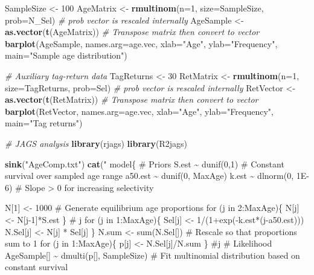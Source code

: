 \documentclass[
]{krantz}
\makeatletter
\newenvironment{Shaded}{\begin{snugshade}}{\end{snugshade}}
\newcommand{\AttributeTok}[1]{\textcolor[rgb]{0.27,0.27,0.27}{#1}}
\newcommand{\CommentTok}[1]{\textcolor[rgb]{0.37,0.37,0.37}{\textit{#1}}}
\newcommand{\DecValTok}[1]{\textcolor[rgb]{0.06,0.06,0.06}{#1}}
\newcommand{\FunctionTok}[1]{\textcolor[rgb]{0.27,0.27,0.27}{\textbf{#1}}}
\newcommand{\NormalTok}[1]{#1}
\newcommand{\OtherTok}[1]{\textcolor[rgb]{0.37,0.37,0.37}{#1}}
\newcommand{\StringTok}[1]{\textcolor[rgb]{0.5,0.5,0.5}{#1}}
\newenvironment{kframe}{%
\medskip{}
\setlength{\fboxsep}{.8em}
 \def\at@end@of@kframe{}%
 \ifinner\ifhmode%
  \def\at@end@of@kframe{\end{minipage}}%
  \begin{minipage}{\columnwidth}%
 \fi\fi%
 \def\FrameCommand##1{\hskip\@totalleftmargin \hskip-\fboxsep
 \colorbox{shadecolor}{##1}\hskip-\fboxsep
     \hskip-\linewidth \hskip-\@totalleftmargin \hskip\columnwidth}%
 \MakeFramed {\advance\hsize-\width
   \@totalleftmargin\z@ \linewidth\hsize
   \@setminipage}}%
 {\par\unskip\endMakeFramed%
 \at@end@of@kframe}
\renewenvironment{Shaded}{\begin{kframe}}{\end{kframe}}
\makeatother
\begin{document}
\begin{Shaded}
\begin{Highlighting}[]
\NormalTok{SampleSize }\OtherTok{\textless{}{-}} \DecValTok{100}
\NormalTok{AgeMatrix }\OtherTok{\textless{}{-}} \FunctionTok{rmultinom}\NormalTok{(}\AttributeTok{n=}\DecValTok{1}\NormalTok{, }\AttributeTok{size=}\NormalTok{SampleSize, }\AttributeTok{prob=}\NormalTok{N\_Sel) }\CommentTok{\# prob vector is rescaled internally}
\NormalTok{AgeSample }\OtherTok{\textless{}{-}} \FunctionTok{as.vector}\NormalTok{(}\FunctionTok{t}\NormalTok{(AgeMatrix)) }\CommentTok{\# Transpose matrix then convert to vector}
\FunctionTok{barplot}\NormalTok{(AgeSample, }\AttributeTok{names.arg=}\NormalTok{age.vec, }\AttributeTok{xlab=}\StringTok{"Age"}\NormalTok{, }\AttributeTok{ylab=}\StringTok{"Frequency"}\NormalTok{, }\AttributeTok{main=}\StringTok{"Sample age distribution"}\NormalTok{)}

\CommentTok{\# Auxiliary tag{-}return data}
\NormalTok{TagReturns }\OtherTok{\textless{}{-}} \DecValTok{30}
\NormalTok{RetMatrix }\OtherTok{\textless{}{-}} \FunctionTok{rmultinom}\NormalTok{(}\AttributeTok{n=}\DecValTok{1}\NormalTok{, }\AttributeTok{size=}\NormalTok{TagReturns, }\AttributeTok{prob=}\NormalTok{Sel) }\CommentTok{\# prob vector is rescaled internally}
\NormalTok{RetVector }\OtherTok{\textless{}{-}} \FunctionTok{as.vector}\NormalTok{(}\FunctionTok{t}\NormalTok{(RetMatrix)) }\CommentTok{\# Transpose matrix then convert to vector}
\FunctionTok{barplot}\NormalTok{(RetVector, }\AttributeTok{names.arg=}\NormalTok{age.vec, }\AttributeTok{xlab=}\StringTok{"Age"}\NormalTok{, }\AttributeTok{ylab=}\StringTok{"Frequency"}\NormalTok{, }\AttributeTok{main=}\StringTok{"Tag returns"}\NormalTok{)}

\CommentTok{\# JAGS analysis}
\FunctionTok{library}\NormalTok{(rjags)}
\FunctionTok{library}\NormalTok{(R2jags)}

\FunctionTok{sink}\NormalTok{(}\StringTok{"AgeComp.txt"}\NormalTok{)}
\FunctionTok{cat}\NormalTok{(}\StringTok{"}
\StringTok{model\{}
\StringTok{    \# Priors}
\StringTok{    S.est \textasciitilde{} dunif(0,1)  \# Constant survival over sampled age range}
\StringTok{    a50.est \textasciitilde{} dunif(0, MaxAge)}
\StringTok{    k.est \textasciitilde{} dlnorm(0, 1E{-}6) \# Slope \textgreater{} 0 for increasing selectivity}

\StringTok{    N[1] \textless{}{-} 1000}
\StringTok{    \# Generate equilibrium age proportions}
\StringTok{    for (j in 2:MaxAge)\{}
\StringTok{      N[j] \textless{}{-} N[j{-}1]*S.est}
\StringTok{    \} \# j}
\StringTok{    for (j in 1:MaxAge)\{}
\StringTok{    Sel[j] \textless{}{-} 1/(1+exp({-}k.est*(j{-}a50.est)))}
\StringTok{     N.Sel[j] \textless{}{-} N[j] * Sel[j]}
\StringTok{    \}}
\StringTok{    N.sum \textless{}{-} sum(N.Sel[]) \# Rescale so that proportions sum to 1}
\StringTok{    for (j in 1:MaxAge)\{}
\StringTok{    p[j] \textless{}{-} N.Sel[j]/N.sum}
\StringTok{    \} \#j}
\StringTok{    \# Likelihood}
\StringTok{    AgeSample[] \textasciitilde{} dmulti(p[], SampleSize)  \# Fit multinomial distribution based on constant survival}


\end{Highlighting}
\end{Shaded}
\end{document}

